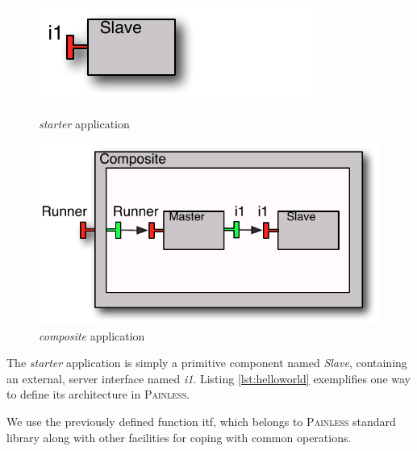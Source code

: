 	 \vspace{-0.6cm}
    \begin{figure}[ht]
	\begin{minipage}[b]{0.35\linewidth} 
	\centering
	
		\includegraphics[scale=1]{figures/chapter5/starter.pdf}
		\caption{\textit{starter} application }		
		\label{fig:starter}

	\end{minipage}
	\hspace{0.25cm}
	\begin{minipage}[b]{0.65\linewidth} 
	\centering
 
		\includegraphics[scale=0.5]{figures/chapter5/composite.pdf}
		\caption{\textit{composite} application }		
		\label{fig:composite}
 
	\end{minipage}
	\end{figure}	  		
\vspace{-0.5cm}

	\noindent The \textit{starter} application is simply a primitive component named \textit{Slave},
	containing an external, server interface named \textit{i1}. Listing \ref{lst:helloworld} exemplifies one way to define  
	its architecture in \textsc{Painless}.


	
	
	
	\noindent We use the previously defined function \textsf{itf}, which belongs to \textsc{Painless} 
	standard library along with other facilities for coping with common operations.
	
